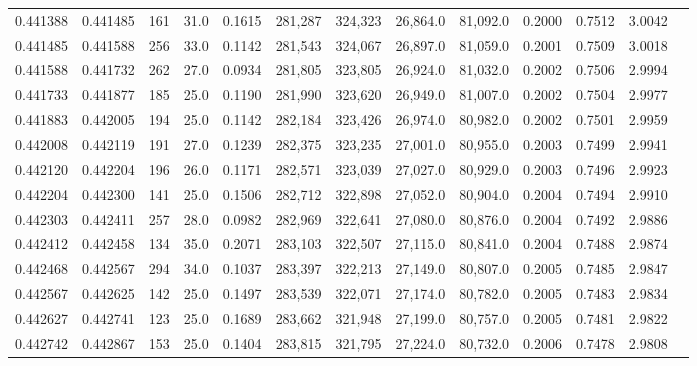 \begin{tabular}{rrrrrrrrrrrrr}
0.441388 & 0.441485 &   161 & 31.0 &                                     0.1615 & 281,287 & 324,323 &  26,864.0 &  81,092.0 & 0.2000 & 0.7512 & 3.0042 \\
0.441485 & 0.441588 &   256 & 33.0 &                                     0.1142 & 281,543 & 324,067 &  26,897.0 &  81,059.0 & 0.2001 & 0.7509 & 3.0018 \\
0.441588 & 0.441732 &   262 & 27.0 &                                     0.0934 & 281,805 & 323,805 &  26,924.0 &  81,032.0 & 0.2002 & 0.7506 & 2.9994 \\
0.441733 & 0.441877 &   185 & 25.0 &                                     0.1190 & 281,990 & 323,620 &  26,949.0 &  81,007.0 & 0.2002 & 0.7504 & 2.9977 \\
0.441883 & 0.442005 &   194 & 25.0 &                                     0.1142 & 282,184 & 323,426 &  26,974.0 &  80,982.0 & 0.2002 & 0.7501 & 2.9959 \\
0.442008 & 0.442119 &   191 & 27.0 &                                     0.1239 & 282,375 & 323,235 &  27,001.0 &  80,955.0 & 0.2003 & 0.7499 & 2.9941 \\
0.442120 & 0.442204 &   196 & 26.0 &                                     0.1171 & 282,571 & 323,039 &  27,027.0 &  80,929.0 & 0.2003 & 0.7496 & 2.9923 \\
0.442204 & 0.442300 &   141 & 25.0 &                                     0.1506 & 282,712 & 322,898 &  27,052.0 &  80,904.0 & 0.2004 & 0.7494 & 2.9910 \\
0.442303 & 0.442411 &   257 & 28.0 &                                     0.0982 & 282,969 & 322,641 &  27,080.0 &  80,876.0 & 0.2004 & 0.7492 & 2.9886 \\
0.442412 & 0.442458 &   134 & 35.0 &                                     0.2071 & 283,103 & 322,507 &  27,115.0 &  80,841.0 & 0.2004 & 0.7488 & 2.9874 \\
0.442468 & 0.442567 &   294 & 34.0 &                                     0.1037 & 283,397 & 322,213 &  27,149.0 &  80,807.0 & 0.2005 & 0.7485 & 2.9847 \\
0.442567 & 0.442625 &   142 & 25.0 &                                     0.1497 & 283,539 & 322,071 &  27,174.0 &  80,782.0 & 0.2005 & 0.7483 & 2.9834 \\
0.442627 & 0.442741 &   123 & 25.0 &                                     0.1689 & 283,662 & 321,948 &  27,199.0 &  80,757.0 & 0.2005 & 0.7481 & 2.9822 \\
0.442742 & 0.442867 &   153 & 25.0 &                                     0.1404 & 283,815 & 321,795 &  27,224.0 &  80,732.0 & 0.2006 & 0.7478 & 2.9808 \\

\end{tabular}
